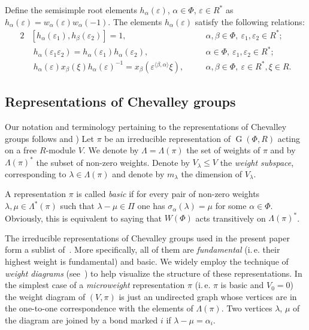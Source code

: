 \documentclass[oneside, 12pt]{amsart}
\theoremstyle{plain}
\numberwithin{equation}{section}
\numberwithin{lemma}{section}
\theoremstyle{definition}
\theoremstyle{remark}
\DeclareMathOperator{\G}{G}
\begin{document}
Define the semisimple root elements $h_\alpha(\varepsilon)$, $\alpha\in\Phi$, $\varepsilon\in R^*$ as $h_\alpha(\varepsilon)=w_\alpha(\varepsilon)w_\alpha(-1)$.
The elements $h_\alpha(\varepsilon)$ satisfy the following relations:
\begin{alignat}{2} 
& [ h_\alpha(\varepsilon_1), h_\beta(\varepsilon_2)] = 1, &\quad& \alpha, \beta \in \Phi, \ \varepsilon_1, \varepsilon_2 \in R^*; \label{rel:h-comm} \\
& \phantom{[} h_\alpha(\varepsilon_1 \varepsilon_2) = h_\alpha(\varepsilon_1) h_\alpha(\varepsilon_2), && \alpha \in \Phi, \ \varepsilon_1, \varepsilon_2 \in R^*; \label{rel:h-mult} \\
& \phantom{[} h_\alpha(\varepsilon)x_\beta(\xi)h_\alpha(\varepsilon)^{-1} = x_\beta\left(\varepsilon^{\langle\beta, \alpha\rangle}\xi\right), && \alpha, \beta \in \Phi, \ \varepsilon \in R^*, \xi \in R. \label{rel:h-w}
\end{alignat}

\subsection{Representations of Chevalley groups} \label{sec:repr}
Our notation and terminology pertaining to the representations of Chevalley groups follows \cite[\S~1.4]{PSV98} and \cite[\S~I.2]{Ma69})
Let $\pi$ be an irreducible representation of $\G(\Phi, R)$ acting on a free $R$-module $V$.
We denote by $\Lambda=\Lambda(\pi)$ the set of weights of $\pi$ and by $\Lambda(\pi)^*$ the subset of non-zero weights.
Denote by $V_\lambda \leq V$ the \emph{weight subspace}, corresponding to $\lambda\in\Lambda(\pi)$ and denote by $m_\lambda$ the dimension of $V_\lambda$.

A representation $\pi$ is called \emph{basic} if for every pair of non-zero weights $\lambda, \mu \in \Lambda^*(\pi)$ such that $\lambda - \mu \in \Pi$ one has $\sigma_\alpha(\lambda) = \mu$ for some $\alpha\in\Phi$.
Obviously, this is equivalent to saying that $W(\Phi)$ acts transitively on $\Lambda(\pi)^*$.

The irreducible representations of Chevalley groups used in the present paper form a sublist of~\cite[Table~2]{PSV98}.
More specifically, all of them are \emph{fundamental} (i.\,e. their highest weight is fundamental) and basic.
We widely employ the technique of \emph{weight diagrams} (see~\cite[\S~2]{PSV98}) to help visualize the structure of these representations.
In the simplest case of a \emph{microweight} representation $\pi$ (i.\,e. $\pi$ is basic and $V_0 = 0$)
the weight diagram of $(V, \pi)$ is just an undirected graph whose vertices are in the one-to-one correspondence with the elements of $\Lambda(\pi)$.
Two vertices $\lambda$, $\mu$ of the diagram are joined by a bond marked $i$ if $\lambda-\mu = \alpha_i$.
\end{document}
